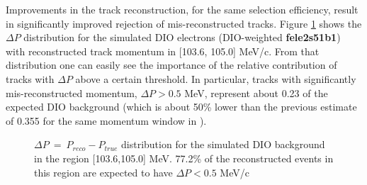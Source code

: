 Improvements in the track reconstruction, for the same selection efficiency, result in  {\blue significantly improved rejection of mis-reconstructed tracks}.
Figure \ref{fig:dio_delta_p_1036_1050} shows the $\Delta{P}$ distribution
for the simulated DIO electrons (DIO-weighted  {\blue \bf fele2s51b1}) with  reconstructed track
 {\blue momentum}
in [103.6, 105.0] MeV/c. From that distribution one can easily  {\blue see the} importance of the relative contribution
of tracks with $\Delta{P}$ above {\blue a} certain threshold. In particular, tracks with significantly mis-reconstructed
 {\blue momentum}, $\Delta{P} > 0.5$ MeV, represent about 0.23 of the expected DIO background
{\blue (which is about 50\% lower than the previous estimate of 0.355 for the same momentum window in \cite{MU2E_4595_ANN_TRAINING}).}

\begin{figure}
  \caption{
    \label{fig:dio_delta_p_1036_1050} 
    $\Delta P ~=~ P_{reco} -P_{true}$ distribution for {\blue the} simulated DIO background in the region [103.6,105.0] MeV.
    77.2\% of {\blue the} reconstructed events in this region are expected to have $\Delta P < 0.5$ MeV/c
  }
\end{figure}

